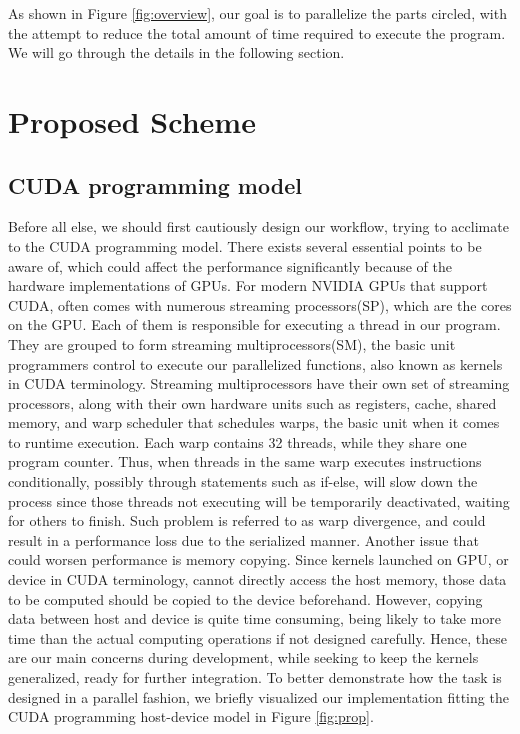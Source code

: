 \documentclass{PHlab-thesis}
\begin{document}
As shown in Figure \ref{fig:overview}, our goal is to parallelize the parts circled, with the attempt to reduce the total amount of time required to execute the program. We will go through the details in the following section.

\section{Proposed Scheme}
\subsection{CUDA programming model}
Before all else, we should first cautiously design our workflow, trying to acclimate to the CUDA programming model. There exists several essential points to be aware of, which could affect the performance significantly because of the hardware implementations of GPUs. For modern NVIDIA GPUs that support CUDA, often comes with numerous streaming processors(SP), which are the cores on the GPU. Each of them is responsible for executing a thread in our program. They are grouped to form streaming multiprocessors(SM), the basic unit programmers control to execute our parallelized functions, also known as kernels in CUDA terminology. Streaming multiprocessors have their own set of streaming processors, along with their own hardware units such as registers, cache, shared memory, and warp scheduler that schedules warps, the basic unit when it comes to runtime execution. Each warp contains 32 threads, while they share one program counter. Thus, when threads in the same warp executes instructions conditionally, possibly through statements such as if-else, will slow down the process since those threads not executing will be temporarily deactivated, waiting for others to finish. Such problem is referred to as warp divergence, and could result in a performance loss due to the serialized manner. Another issue that could worsen performance is memory copying. Since kernels launched on GPU, or device in CUDA terminology, cannot directly access the host memory, those data to be computed should be copied to the device beforehand. However, copying data between host and device is quite time consuming, being likely to take more time than the actual computing operations if not designed carefully. Hence, these are our main concerns during development, while seeking to keep the kernels generalized, ready for further integration. To better demonstrate how the task is designed in a parallel fashion, we briefly visualized our implementation fitting the CUDA programming host-device model in Figure \ref{fig:prop}. 
\end{document}
